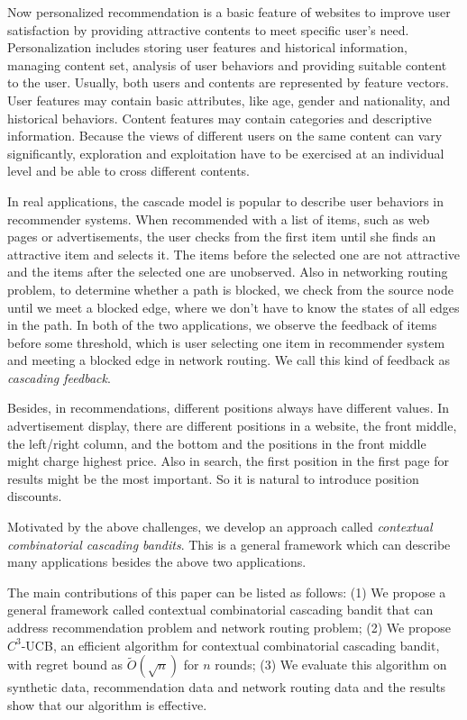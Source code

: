 \documentclass{article}
\begin{document}
Now personalized recommendation is a basic feature of websites to improve user satisfaction by providing attractive contents to meet specific user's need. Personalization includes storing user features and historical information, managing content set, analysis of user behaviors and providing suitable content to the user. Usually, both users and contents are represented by feature vectors. User features may contain basic attributes, like age, gender and nationality, and historical behaviors. Content features may contain categories and descriptive information. Because the views of different users on the same content can vary significantly, exploration and exploitation have to be exercised at an individual level and be able to cross different contents.

In real applications, the cascade model is popular to describe user behaviors in recommender systems. When recommended with a list of items, such as web pages or advertisements, the user checks from the first item until she finds an attractive item and selects it. The items before the selected one are not attractive and the items after the selected one are unobserved. Also in networking routing problem, to determine whether a path is blocked, we check from the source node until we meet a blocked edge, where we don't have to know the states of all edges in the path. In both of the two applications, we observe the feedback of items before some threshold, which is user selecting one item in recommender system and meeting a blocked edge in network routing. We call this kind of feedback as {\it cascading feedback}. 

Besides, in recommendations, different positions always have different values. In advertisement display, there are different positions in a website, the front middle, the left/right column, and the bottom and the positions in the front middle might charge highest price. Also in search, the first position in the first page for results might be the most important. So it is natural to introduce position discounts.

Motivated by the above challenges, we develop an approach called {\it contextual combinatorial cascading bandits}. This is a general framework which can describe many applications besides the above two applications.

The main contributions of this paper can be listed as follows: (1) We propose a general framework called contextual combinatorial cascading bandit that can address recommendation problem and network routing problem; (2) We propose $C^3$-UCB, an efficient algorithm for contextual combinatorial cascading bandit, with regret bound as $\tilde{O}(\sqrt{n})$ for $n$ rounds; (3) We evaluate this algorithm on synthetic data, recommendation data and network routing data and the results show that our algorithm is effective.
\end{document}
